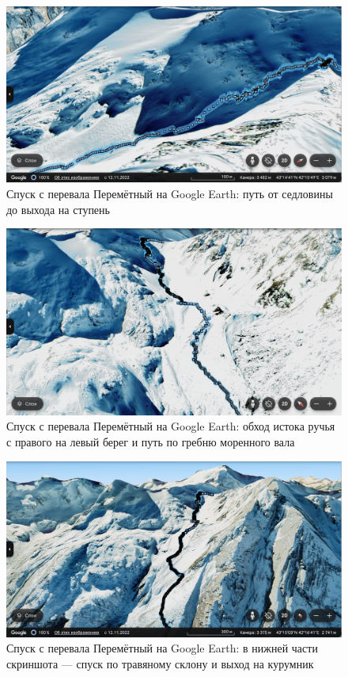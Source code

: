 \begin{figure}[h!]
	\centering
	\includegraphics[width=0.7\linewidth]{../pics/google_earth/Peremetny-1.png}
	\caption{Спуск с перевала Перемётный на Google Earth: путь от седловины до выхода на ступень}
	\label{Peremetny-1}
\end{figure} 
\begin{figure}[h!]
	\centering
	\includegraphics[width=0.7\linewidth]{../pics/google_earth/Peremetny-3.png}
	\caption{Спуск с перевала Перемётный на Google Earth: обход истока ручья с правого на левый берег и путь по гребню моренного вала}
	\label{Peremetny-3}
\end{figure} 
\begin{figure}[h!]
	\centering
	\includegraphics[width=0.7\linewidth]{../pics/google_earth/Peremetny-2.png}
	\caption{Спуск с перевала Перемётный на Google Earth: в нижней части скриншота --- спуск по травяному склону и выход на курумник}
	\label{Peremetny-2}
\end{figure} 


